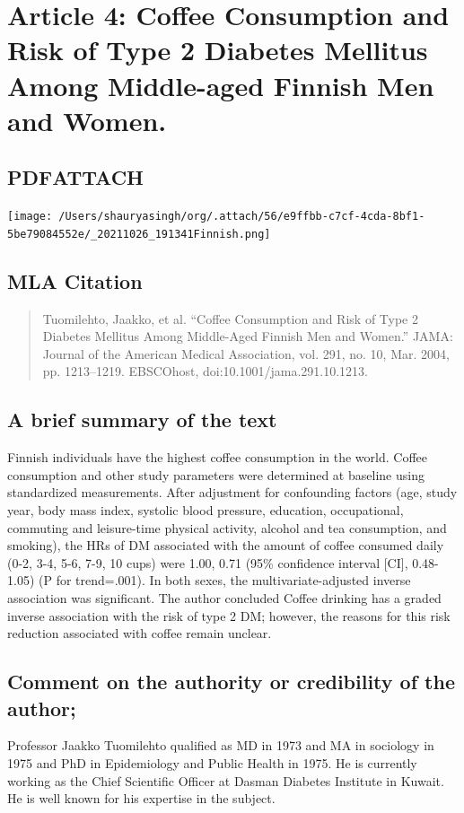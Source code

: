 \documentclass{scrartcl}
\begin{document}
\section{Article 4:  Coffee Consumption and Risk of Type 2 Diabetes Mellitus Among Middle-aged Finnish Men and Women.}
\label{sec:orgbd8c2fc}
\subsection{PDF\hfill{}\textsc{ATTACH}}
\label{sec:org303d1b6}
\begin{center}
\texttt{[image: /Users/shauryasingh/org/.attach/56/e9ffbb-c7cf-4cda-8bf1-5be79084552e/\_20211026\_191341Finnish.png]}
\end{center}

\subsection{MLA Citation}
\label{sec:orgcecc063}
\begin{quote}
Tuomilehto, Jaakko, et al. “Coffee Consumption and Risk of Type 2 Diabetes Mellitus Among Middle-Aged Finnish Men and Women.” JAMA: Journal of the American Medical Association, vol. 291, no. 10, Mar. 2004, pp. 1213–1219. EBSCOhost, doi:10.1001/jama.291.10.1213.
\end{quote}
\subsection{A brief summary of the text}
\label{sec:orgd979969}
Finnish individuals have the highest coffee consumption in the world. Coffee consumption and other study parameters were determined at baseline using standardized measurements. After adjustment for confounding factors (age, study year, body mass index, systolic blood pressure, education, occupational, commuting and leisure-time physical activity, alcohol and tea consumption, and smoking), the HRs of DM associated with the amount of coffee consumed daily (0-2, 3-4, 5-6, 7-9,  10 cups) were 1.00, 0.71 (95\% confidence interval [CI], 0.48-1.05) (P for trend=.001). In both sexes, the multivariate-adjusted inverse association was significant. The author concluded Coffee drinking has a graded inverse association with the risk of type 2 DM; however, the reasons for this risk reduction associated with coffee remain unclear.
\subsection{Comment on the authority or credibility of the author;}
\label{sec:orgac71651}
Professor Jaakko Tuomilehto qualified as MD in 1973 and MA in sociology in 1975 and PhD in Epidemiology and Public Health in 1975. He is currently working as the Chief Scientific Officer at Dasman Diabetes Institute in Kuwait. He is well known for his expertise in the subject.
\end{document}
